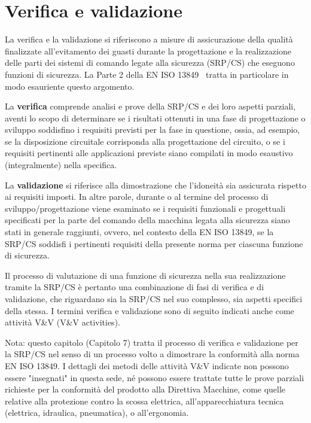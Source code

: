 \chapter{Verifica e validazione}
\label{cap:07}
La verifica e la validazione si riferiscono a misure di assicurazione della qualità finalizzate all'evitamento dei guasti durante la progettazione e la realizzazione delle parti dei sistemi di comando legate alla sicurezza (SRP/CS) che eseguono funzioni di sicurezza. La Parte 2 della EN ISO 13849~\cite{eniso13849-2} tratta in particolare in modo esauriente questo argomento.

La \textbf{verifica} comprende analisi e prove della SRP/CS e dei loro aspetti parziali, aventi lo scopo di determinare se i risultati ottenuti in una fase di progettazione o sviluppo soddisfino i requisiti previsti per la fase in questione, ossia, ad esempio, se la disposizione circuitale corrisponda alla progettazione del circuito, o se i requisiti pertinenti alle applicazioni previste siano compilati in modo esaustivo (integralmente) nella specifica.

La \textbf{validazione} si riferisce alla dimostrazione che l'idoneità sia assicurata rispetto ai requisiti imposti. In altre parole, durante o al termine del processo di sviluppo/progettazione viene esaminato se i requisiti funzionali e progettuali specificati per la parte del comando della macchina legata alla sicurezza siano stati in generale raggiunti, ovvero, nel contesto della EN ISO 13849, se la SRP/CS soddisfi i pertinenti requisiti della presente norma per ciascuna funzione di sicurezza.

Il processo di valutazione di una funzione di sicurezza nella sua realizzazione tramite la SRP/CS è pertanto una combinazione di fasi di verifica e di validazione, che riguardano sia la SRP/CS nel suo complesso, sia aspetti specifici della stessa. I termini verifica e validazione sono di seguito indicati anche come attività V\&V (V\&V activities).

Nota: questo capitolo (Capitolo 7) tratta il processo di verifica e validazione per la SRP/CS nel senso di un processo volto a dimostrare la conformità alla norma EN ISO 13849. I dettagli dei metodi delle attività V\&V indicate non possono essere "insegnati" in questa sede, né possono essere trattate tutte le prove parziali richieste per la conformità del prodotto alla Direttiva Macchine, come quelle relative alla protezione contro la scossa elettrica, all'apparecchiatura tecnica (elettrica, idraulica, pneumatica), o all'ergonomia.

